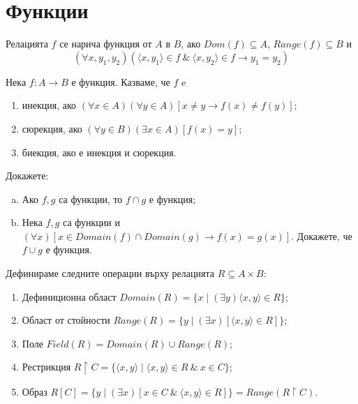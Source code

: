 \section{Функции}


\begin{dfn}
  Релацията $f$ се нарича функция от $A$ в $B$, ако
  $Dom(f)\subseteq A$, $Range(f)\subseteq B$ и 
  \[(\forall x,y_1,y_2)(\langle{x,y_1}\rangle\in f\ \&\ \langle{x,y_2}\rangle\in f \rightarrow y_1 = y_2)\]
\end{dfn}


\begin{dfn}
  Нека $f:A\rightarrow B$ е функция. Казваме, че $f$ e
  \begin{enumerate}
    \item
      инекция, ако $(\forall x\in A)(\forall y\in A)[x\neq y \rightarrow f(x)\neq f(y)]$;
    \item
      сюрекция, ако $(\forall y\in B)(\exists x\in A)[f(x) = y]$;
    \item
      биекция, ако е инекция и сюрекция.
  \end{enumerate}
\end{dfn}


\begin{problem}
  Докажете:
  \begin{enumerate}[a)]
  \item
    Ако $f,g$ са функции, то $f\cap g$ е функция;
  \item
    Нека $f,g$ са функции и $(\forall x)[x\in Domain(f)\cap Domain(g)\rightarrow f(x) = g(x)]$.
    Докажете, че $f\cup g$ е функция.
  \end{enumerate}
\end{problem}


\begin{dfn}
  Дефинираме следните операции върху релацията $R\subseteq A\times{B}$:
  \begin{enumerate}
  \item
    Дефиниционна област
    $Domain(R) = \{x\mid (\exists y)\langle{x,y}\rangle\in R \}$;
  \item
    Област от стойности
    $Range(R) = \{y\mid (\exists x)[\langle{x,y}\rangle\in R]\}$;
  \item
    Поле
    $Field(R) = Domain(R) \cup Range(R)$;
  \item
    Рестрикция
    $R\upharpoonright{C} = \{\langle{x,y}\rangle\mid \langle{x,y}\rangle\in R\ \&\ x\in C\}$;
  \item
    Образ
    $R[C] = \{ y \mid (\exists x)[ x\in C\ \&\ \langle{x,y}\rangle\in R]\} = Range(R\upharpoonright{C})$.


\end{enumerate}
\end{dfn}



